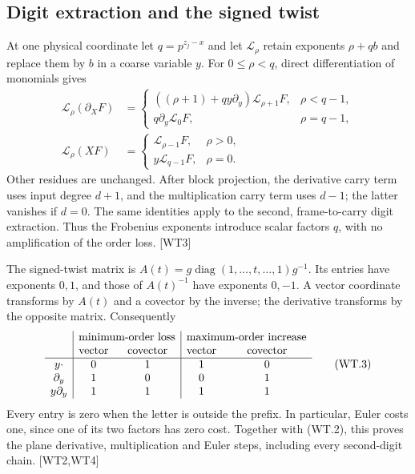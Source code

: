 \subsection{Digit extraction and the signed twist}

At one physical coordinate let $q=p^{z_j-x}$ and let $\mathcal L_\rho$
retain exponents $\rho+qb$ and replace them by $b$ in a coarse variable $y$.
For $0\le\rho<q$, direct differentiation of monomials gives
\[
\begin{aligned}
 \mathcal L_\rho(\partial_X F)
 &=\begin{cases}
 ((\rho+1)+qy\partial_y)\mathcal L_{\rho+1}F,&\rho<q-1,\\
 q\partial_y\mathcal L_0F,&\rho=q-1,
 \end{cases}\\
 \mathcal L_\rho(XF)
 &=\begin{cases}
 \mathcal L_{\rho-1}F,&\rho>0,\\
 y\mathcal L_{q-1}F,&\rho=0.
 \end{cases}
\end{aligned}
\tag{WT.2}
\]
Other residues are unchanged. After block projection, the derivative
carry term uses input degree $d+1$, and the multiplication carry term
uses $d-1$; the latter vanishes if $d=0$.
The same identities apply to the second, frame-to-carry digit extraction.
Thus the Frobenius exponents introduce scalar factors $q$, with no
amplification of the order loss. \textsf{[WT3]}

The signed-twist matrix is
$A(t)=g\operatorname{diag}(1,\ldots,t,\ldots,1)g^{-1}$.
Its entries have exponents $0,1$, and those of $A(t)^{-1}$ have exponents
$0,-1$. A vector coordinate transforms by $A(t)$ and a covector by the
inverse; the derivative transforms by the opposite matrix. Consequently
\[
\begin{array}{c|cc|cc}
 &\multicolumn{2}{c|}{\text{minimum-order loss}}
 &\multicolumn{2}{c}{\text{maximum-order increase}}\\
 &\text{vector}&\text{covector}&\text{vector}&\text{covector}\\ \hline
 y\cdot&0&1&1&0\\
 \partial_y&1&0&0&1\\
 y\partial_y&1&1&1&1
\end{array}
\tag{WT.3}
\]
Every entry is zero when the letter is outside the prefix. In particular,
Euler costs one, since one of its two factors has zero cost.
Together with (WT.2), this proves the plane derivative, multiplication
and Euler steps, including every second-digit chain. \textsf{[WT2,WT4]}


